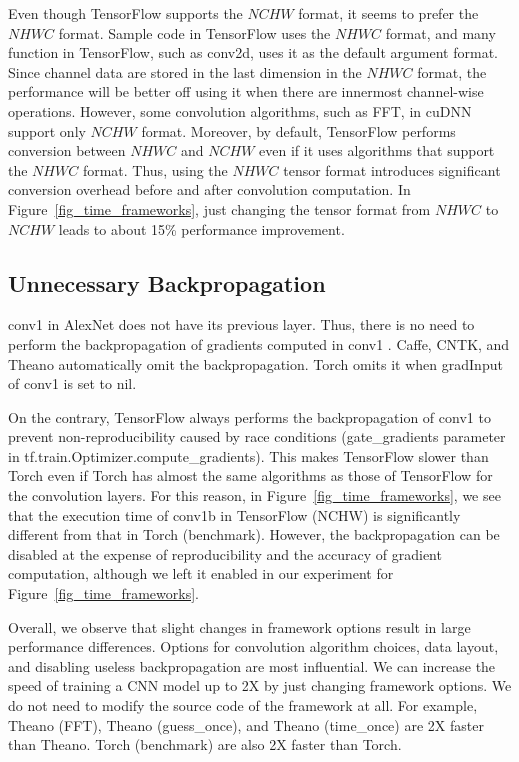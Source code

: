 Even though TensorFlow supports the $NCHW$ format, it seems to prefer the $NHWC$ format. Sample code in TensorFlow uses the $NHWC$ format, and many function in TensorFlow, such as conv2d, uses it as the default argument format. Since channel data are stored in the last dimension in the $NHWC$ format, the performance will be better off using it when there are innermost channel-wise operations. However, some convolution algorithms, such as FFT, in cuDNN support only $NCHW$ format. Moreover, by default, TensorFlow performs conversion between $NHWC$ and $NCHW$ even if it uses algorithms that support the $NHWC$ format. Thus, using the $NHWC$ tensor format introduces significant conversion overhead before and after convolution computation. In Figure~\ref{fig_time_frameworks}, just changing the tensor format from $NHWC$ to $NCHW$ leads to about 15\% performance improvement. 

\subsection{Unnecessary Backpropagation}
\textsf{conv1} in AlexNet does not have its previous layer. Thus, there is no need to perform the backpropagation of gradients computed in \textsf{conv1} . Caffe, CNTK, and Theano automatically omit the backpropagation. Torch omits it when \textsf{gradInput} of \textsf{conv1}  is set to nil.

On the contrary, TensorFlow always performs the backpropagation of \textsf{conv1}  to prevent non-reproducibility caused by race conditions (gate\_gradients parameter in tf.train.Optimizer.compute\_gradients). This makes TensorFlow slower than Torch even if Torch has almost the same algorithms as those of TensorFlow for the convolution layers. For this reason, in Figure~\ref{fig_time_frameworks}, we see that the execution time of \textsf{conv1b} in \textsf{TensorFlow (NCHW)} is significantly different from that in \textsf{Torch (benchmark)}. However, the backpropagation can be disabled at the expense of reproducibility and the accuracy of gradient computation, although we left it enabled in our experiment for Figure~\ref{fig_time_frameworks}.


Overall, we observe that slight changes in framework options result in large performance differences. Options for convolution algorithm choices, data layout, and disabling useless backpropagation are most influential. We can increase the speed of training a CNN model up to 2X by just changing framework options. We do not need to modify the source code of the framework at all. For example, \textsf{Theano (FFT)}, \textsf{Theano (guess\_once)}, and \textsf{Theano (time\_once)} are 2X faster than \textsf{Theano}. \textsf{Torch (benchmark)} are also 2X faster than \textsf{Torch}.

